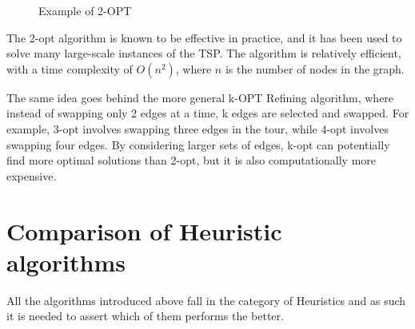 \begin{figure}[!h]
    \centering
    \caption{Example of 2-OPT} \label{fig:2OPT}
\end{figure}



The 2-opt algorithm is known to be effective in practice, and it has been used to solve many large-scale instances of the TSP. The algorithm is relatively efficient, with a time complexity of $O(n^2)$, where $n$ is the number of nodes in the graph.

The same idea goes behind the more general k-OPT Refining algorithm, where instead of swapping only 2 edges at a time, k edges are selected and swapped. For example, 3-opt involves swapping three edges in the tour, while 4-opt involves swapping four edges. By considering larger sets of edges, k-opt can potentially find more optimal solutions than 2-opt, but it is also computationally more expensive.






\section{Comparison of Heuristic algorithms}
All the algorithms introduced above fall in the category of Heuristics and as such it is needed to assert which of them performs the better.


